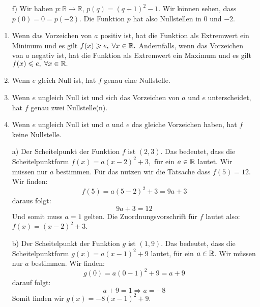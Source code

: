 \documentclass[12pt]{article}
\begin{document}
\begin{solution}[ex:nullstellen]
\begin{enumerate}
\item[f)] Wir haben $p:\mathbb{R}\to \mathbb{R}$, $p(q)=(q+1)^{2}-1$.
Wir können sehen, dass $p(0) = 0 = p(-2)$. Die Funktion $p$ hat also Nullstellen in $0$ und $-2$.
\end{enumerate}
\end{solution}

\begin{solution}
\begin{enumerate}[label=\alph*)]
\item Wenn das Vorzeichen von $a$ positiv ist, hat die Funktion als Extremwert ein Minimum und es gilt $f(x) \geqslant e, \; \forall x \in \mathbb{R}.$ Andernfalls, wenn das Vorzeichen von $a$ negativ ist, hat die Funktion als Extremwert ein Maximum und es gilt $f(x) \leqslant e, \; \forall x \in \mathbb{R}.$
\item Wenn $e$ gleich Null ist, hat $f$ genau eine Nullstelle.

\item Wenn $e$ ungleich Null ist und sich das Vorzeichen von $a$ und $e$ unterscheidet, hat $f$ genau zwei Nullstelle(n).

\item Wenn $e$ ungleich Null ist und $a$ und $e$ das gleiche Vorzeichen haben, hat $f$ keine Nullstelle.
\end{enumerate}
\end{solution}
\begin{solution}
\begin{enumerate}
\item[a)] Der Scheitelpunkt der Funktion $f$ ist $(2,3)$. Das bedeutet, dass die Scheitelpunktform $f(x)=a(x-2)^{2}+3,$ für ein $a\in \mathbb{R}$ lautet. Wir müssen nur $a$ bestimmen. Für das nutzen wir die Tatsache dass $f(5)=12$. Wir finden:
$$f(5)=a(5-2)^{2}+3=9a+3$$
daraus folgt:
$$9a+3=12$$
Und somit muss $a=1$ gelten.
Die Zuordnungsvorschrift für $f$ lautet also: $f(x)=(x-2)^{2}+3$. 
\item[b)] Der Scheitelpunkt der Funktion $g$ ist $(1,9)$. Das bedeutet, dass die Scheitelpunktform $g(x)=a(x-1)^{2}+9$ lautet, für ein $a\in\mathbb{R}$. Wir müssen nur $a$ bestimmen. Wir finden: 
$$g(0)=a(0-1)^{2}+9=a+9$$
darauf folgt:
$$a+9 = 1 \Rightarrow a = -8$$
Somit finden wir $g(x)=-8(x-1)^{2}+9$. 
\end{enumerate}
\end{solution}
\end{document}
